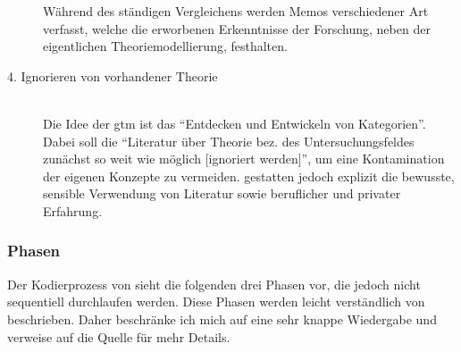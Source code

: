 \begin{description}
  Während des ständigen Vergleichens werden Memos verschiedener Art verfasst, welche die erworbenen Erkenntnisse der Forschung, neben der eigentlichen Theoriemodellierung, festhalten.
  
  \item[4. Ignorieren von vorhandener Theorie] \hfill \\
  Die Idee der \gls{gtm} ist das ``Entdecken und Entwickeln von Kategorien''. Dabei soll die ``Literatur über Theorie bez. des Untersuchungsfeldes zunächst so weit wie möglich [ignoriert werden]'', um eine Kontamination der eigenen Konzepte zu vermeiden. \cite{strauss1996grounded} gestatten jedoch explizit die bewusste, sensible Verwendung von Literatur sowie beruflicher und privater Erfahrung.
\end{description}



\subsubsection{Phasen}

Der Kodierprozess von \cite{strauss1990basics} sieht die folgenden drei Phasen vor, die jedoch nicht sequentiell durchlaufen werden. Diese Phasen werden leicht verständlich von \citet[][S. 62 ff.]{Salinger:2013vd} beschrieben. Daher beschränke ich mich auf eine sehr knappe Wiedergabe und verweise auf die Quelle für mehr Details.

